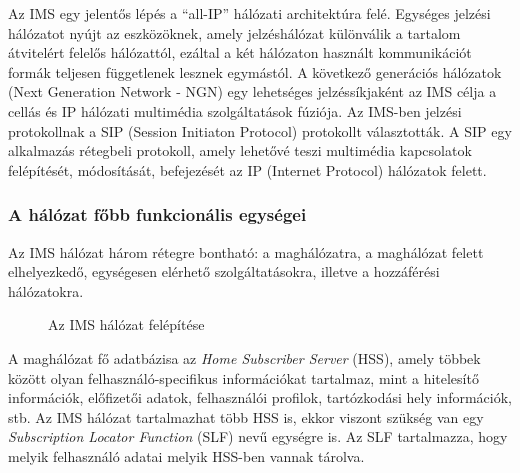 Az IMS egy jelentős lépés a ``all-IP'' hálózati architektúra felé. Egységes jelzési hálózatot nyújt az eszközöknek, amely jel\-zés\-há\-ló\-zat különválik a tartalom átvitelért felelős hálózattól, ezáltal a két hálózaton használt kommunikációt formák teljesen függetlenek lesznek egymástól. A következő generációs hálózatok (Next Generation Network - NGN) egy lehetséges jelzéssíkjaként az IMS célja a cellás és IP hálózati multimédia szolgáltatások fúziója. Az IMS-ben jelzési protokollnak a  SIP (Session Initiaton Protocol) protokollt választották. A SIP egy alkalmazás rétegbeli protokoll, amely lehetővé teszi multimédia kapcsolatok felépítését, módosítását, befejezését az IP (Internet Protocol) hálózatok felett. 

\subsubsection{A hálózat főbb funkcionális egységei}

Az IMS hálózat három rétegre bontható: a maghálózatra, a maghálózat felett elhelyezkedő, egységesen elérhető szolgáltatásokra, illetve a hozzáférési hálózatokra.

\begin{figure}[htbp]
\center
{}
\caption{Az IMS hálózat felépítése}
\label{fig:model}
\end{figure}

A maghálózat fő adatbázisa az \emph{Home Subscriber Server} (HSS), amely többek között olyan felhasználó-specifikus információkat tartalmaz, mint a hitelesítő információk, előfizetői adatok, felhasználói profilok, tartózkodási hely információk, stb. Az IMS hálózat tartalmazhat több HSS is, ekkor viszont szükség van egy \emph{Subscription Locator Function} (SLF) nevű egységre is. Az SLF tartalmazza, hogy melyik felhasználó adatai melyik HSS-ben vannak tárolva.


